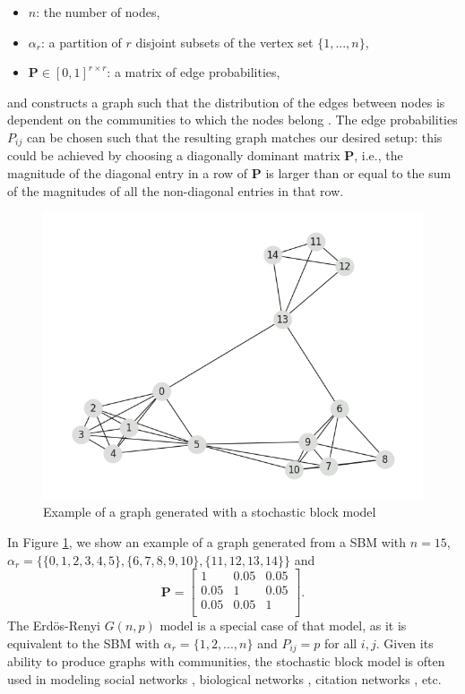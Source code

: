 \documentclass[12pt, oneside]{report}   	%
\begin{document}
\begin{itemize}
    \item $n$: the number of nodes,
    \item $\alpha_r$: a partition of $r$ disjoint subsets of the vertex set $\{1,...,n\}$,
    \item $\boldsymbol{P}\in[0,1]^{r\times r}$: a matrix of edge probabilities,
\end{itemize}
and constructs a graph such that the distribution of the edges between nodes is dependent on the communities to which the nodes belong \cite{holland1983stochastic}. The edge probabilities $P_{ij}$ can be chosen such that the resulting graph matches our desired setup: this could be achieved by choosing a diagonally dominant matrix $\boldsymbol{P}$, i.e., the magnitude of the diagonal entry in a row of $\boldsymbol{P}$ is larger than or equal to the sum of the magnitudes of all the non-diagonal entries in that row.
\begin{figure}[t]
    \centering
    \includegraphics[scale=0.4]{sbmexample.png}
    \caption{Example of a graph generated with a stochastic block model}
    \label{fig:example_sbm}
\end{figure}
\noindent In Figure \ref{fig:example_sbm}, we show an example of a graph generated from a SBM with $n=15$, $\alpha_r=\{\{0,1,2,3,4,5\}, \{6,7,8,9,10\}, \{11,12,13,14\}\}$ and 
$$
 \boldsymbol{P} =
\begin{bmatrix}
1 & 0.05 & 0.05 \\
0.05 & 1 & 0.05 \\
0.05 & 0.05 & 1 \\
\end{bmatrix}.
$$
\noindent The Erdös-Renyi $G(n,p)$ model is a special case of that model, as it is equivalent to the SBM with $\alpha_r=\{1,2,...,n\}$ and $P_{ij}=p$ for all $i,j$. Given its ability to produce graphs with communities, the stochastic block model is often used in modeling social networks \cite{holland1983stochastic}, biological networks \cite{morelli2021nested}, citation networks \cite{hric2018stochastic}, etc.
\end{document}
